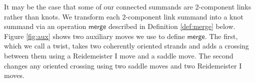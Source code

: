 \documentclass[12pt]{amsart}
\theoremstyle{definition}
\theoremstyle{remark}
\numberwithin{equation}{section}
\newcommand{\merge}{\textsf{merge}}
\begin{document}
%
%
%

It may be the case that some of our connected summands are 2-component links rather than knots. We transform each 2-component link summand into a knot summand via an operation $\merge$ described in Definition \ref{def:merge} below.  Figure \ref{fig:aux} shows two auxiliary moves we use to define $\merge$.  The first, which we call a twist, takes two coherently oriented strands and adds a crossing between them using a Reidemeister I move and a saddle move.  The second changes any oriented crossing using two saddle moves and two Reidemeister I moves.
\end{document}
